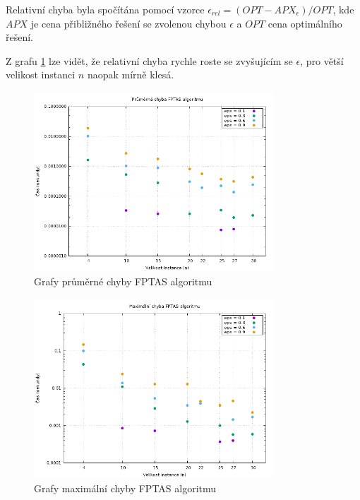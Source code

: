 \documentclass[11pt]{article}
\begin{document}
Relativní chyba byla spočítána pomocí vzorce $\epsilon_{rel} = (OPT - APX_\epsilon) / OPT$, kde $APX$ je cena přibližného řešení se zvolenou chybou $\epsilon$ a $OPT$ cena optimálního řešení. 

Z grafu \ref{fig:apx_error} lze vidět, že relativní chyba rychle roste se zvyšujícím se $\epsilon$, pro větší velikost instanci $n$ naopak mírně klesá.

\begin{figure}[h!]
	\centering
    	\includegraphics[width=0.8\textwidth]{apx_error.png}
    	\caption{Grafy průměrné chyby FPTAS algoritmu}
	\label{fig:apx_error}
\end{figure}

\begin{figure}[h!]
	\centering
    	\includegraphics[width=0.8\textwidth]{apx_max_error.png}
    	\caption{Grafy maximální chyby FPTAS algoritmu}
	\label{fig:apx_max_error}
\end{figure}

\newpage
\end{document}
